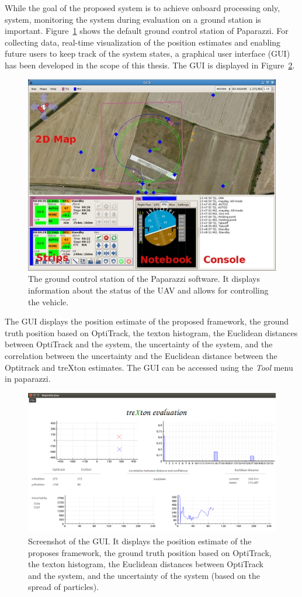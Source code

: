 \documentclass{report}
\begin{document}
While the goal of the proposed system is to achieve onboard processing
only, system, monitoring the system during evaluation on a ground
station is important. Figure~\ref{fig:gcs} shows the default ground
control station of Paparazzi. For collecting data, real-time
visualization of the position estimates and enabling future users to
keep track of the system states, a graphical user interface (GUI) has
been developed in the scope of this thesis. The GUI is displayed in
Figure~\ref{fig:gui}.
\begin{figure}[t]
\begin{center}
\includegraphics[width=0.7\columnwidth]{Gcs}
\caption{{\label{fig:gcs} The ground control station of the Paparazzi
    software. It displays information about the status of the UAV and
    allows for controlling the vehicle.%
  }}
\end{center}
\end{figure}
The GUI displays the position estimate of the proposed framework, the
ground truth position based on OptiTrack, the texton histogram, the
Euclidean distances between OptiTrack and the system, the uncertainty
of the system, and the correlation between the uncertainty and the
Euclidean distance between the Optitrack and treXton estimates. The
GUI can be accessed using the \emph{Tool} menu in paparazzi.
\begin{figure}[t]
\begin{center}
\includegraphics[width=0.7\columnwidth]{gui-cut}
\caption{{\label{fig:gui} Screenshot of the GUI. It displays the
    position estimate of the proposes framework, the ground truth
    position based on OptiTrack, the texton histogram, the Euclidean
    distances between OptiTrack and the system, and the uncertainty of
    the system (based on the spread of particles).%
  }}
\end{center}
\end{figure}
\end{document}
